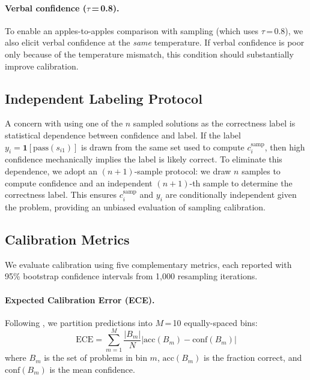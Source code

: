 \documentclass{article}
\begin{document}
\paragraph{Verbal confidence ($\tau$\,=\,0.8).}
To enable an apples-to-apples comparison with sampling (which uses $\tau$\,=\,0.8), we also elicit verbal confidence at the \emph{same} temperature. If verbal confidence is poor only because of the temperature mismatch, this condition should substantially improve calibration.

\subsection{Independent Labeling Protocol}
\label{sec:independent}

A concern with using one of the $n$ sampled solutions as the correctness label is statistical dependence between confidence and label. If the label $y_i = \mathbf{1}[\text{pass}(s_{i1})]$ is drawn from the same set used to compute $c_i^{\text{samp}}$, then high confidence mechanically implies the label is likely correct. To eliminate this dependence, we adopt an $(n+1)$-sample protocol: we draw $n$ samples to compute confidence and an independent $(n+1)$-th sample to determine the correctness label. This ensures $c_i^{\text{samp}}$ and $y_i$ are conditionally independent given the problem, providing an unbiased evaluation of sampling calibration.

\subsection{Calibration Metrics}
\label{sec:metrics}

We evaluate calibration using five complementary metrics, each reported with 95\% bootstrap confidence intervals from 1,000 resampling iterations.

\paragraph{Expected Calibration Error (ECE).}
Following \citet{naeini2015obtaining}, we partition predictions into $M$\,=\,10 equally-spaced bins:
\begin{equation}
  \text{ECE} = \sum_{m=1}^{M} \frac{|B_m|}{N} \left| \text{acc}(B_m) - \text{conf}(B_m) \right|
  \label{eq:ece}
\end{equation}
where $B_m$ is the set of problems in bin $m$, $\text{acc}(B_m)$ is the fraction correct, and $\text{conf}(B_m)$ is the mean confidence.
\end{document}
